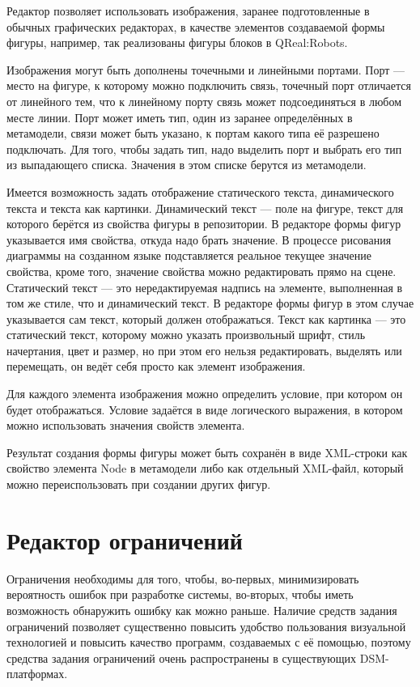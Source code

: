 Редактор позволяет использовать изображения, заранее подготовленные в обычных графических 
редакторах, в качестве элементов создаваемой формы фигуры, например, так реализованы 
фигуры блоков в QReal:Robots. 

Изображения могут быть дополнены точечными и линейными портами. Порт --- место на 
фигуре, к которому можно подключить связь, точечный порт отличается от линейного тем, 
что к линейному порту связь может подсоединяться в любом месте линии. Порт может иметь 
тип, один из заранее определённых в метамодели, связи может быть указано, к портам 
какого типа её разрешено подключать. Для того, чтобы задать тип, надо выделить порт 
и выбрать его тип из выпадающего списка. Значения в этом списке берутся из метамодели.

Имеется возможность задать отображение статического текста, динамического текста и 
текста как картинки. Динамический текст --- поле на фигуре, текст для которого берётся 
из свойства фигуры в репозитории. В редакторе формы фигур указывается имя свойства, 
откуда надо брать значение. В процессе рисования диаграммы на созданном языке подставляется 
реальное текущее значение свойства, кроме того, значение свойства можно редактировать 
прямо на сцене. Статический текст --- это нередактируемая надпись на элементе, выполненная 
в том же стиле, что и динамический текст. В редакторе формы фигур в этом случае указывается 
сам текст, который должен отображаться. Текст как картинка --- это статический текст, 
которому можно указать произвольный шрифт, стиль начертания, цвет и размер, но при 
этом его нельзя редактировать, выделять или перемещать, он ведёт себя просто как элемент 
изображения.

Для каждого элемента изображения можно определить условие, при котором он будет отображаться. 
Условие задаётся в виде логического выражения, в котором можно использовать значения 
свойств элемента. 

Результат создания формы фигуры может быть сохранён в виде XML-строки как свойство 
элемента Node в метамодели либо как отдельный XML-файл, который можно переиспользовать 
при создании других фигур.

\section{Редактор ограничений}
Ограничения необходимы для того, чтобы, во-первых, минимизировать вероятность ошибок 
при разработке системы, во-вторых, чтобы иметь возможность обнаружить ошибку как можно 
раньше. Наличие средств задания ограничений позволяет существенно повысить удобство 
пользования визуальной технологией и повысить качество программ, создаваемых с её помощью, 
поэтому средства задания ограничений очень распространены в существующих \ac{DSM}-платформах. 

